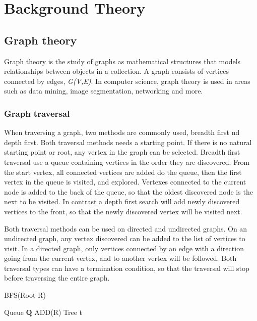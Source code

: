 \chapter{Background Theory}
\label{cha:background_theory}
\section{Graph theory}
Graph theory is the study of graphs as mathematical structures that models relationships between objects in a collection. A graph consists of vertices connected by edges, \emph{G(V,E)}. In computer science, graph theory is used in areas such as data mining, image segmentation, networking and more\cite{riaz2011applications}. 

\subsection{Graph traversal}
When traversing a graph, two methods are commonly used, breadth first nd depth first. Both traversal methods needs a starting point. If there is no natural starting point or root, any vertex in the graph can be selected. Breadth first traversal use a queue containing vertices in the order they are discovered. From the start vertex, all connected vertices are added do the queue, then the first vertex in the queue is visited, and explored. Vertexes connected to the current node is added to the back of the queue, so that the oldest discovered node is the next to be visited. In contrast a depth first search will add newly discovered vertices to the front, so that the newly discovered vertex will be visited next.

Both traversal methods can be used on directed and undirected graphs. On an undirected graph, any vertex discovered can be added to the list of vertices to visit. In a directed graph, only vertices connected by an edge with a direction going from the current vertex, and to another vertex will be followed. Both traversal types can have a termination condition, so that the traversal will stop before traversing the entire graph. 

\begin{algorithm}[H]
    \caption{BFS(Root R)}
    \label{BFS}
    \SetAlgoLined
    Queue $\mathbf{Q}$ ADD(R)\; Tree t \;
\end{algorithm}

